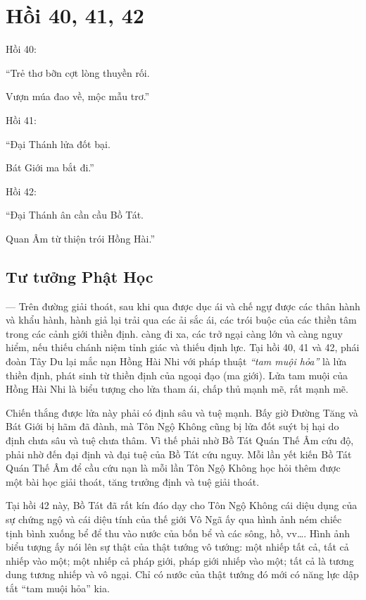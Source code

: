 \chapter{Hồi 40, 41, 42} %
\label{cha:hoi_40_41}

Hồi 40:

\begin{itshape}
``Trẻ thơ bỡn cợt lòng thuyền rối.

Vượn múa đao về, mộc mẫu trơ.''
\end{itshape}

Hồi 41:

\begin{itshape}
``Đại Thánh lửa đốt bại.

Bát Giới ma bắt đi.''
\end{itshape}

Hồi 42:

\begin{itshape}
``Đại Thánh ân cần cầu Bồ Tát.

Quan Âm từ thiện trói Hồng Hài.''
\end{itshape}

\section{Tư tưởng Phật Học} %
\label{sec:40_41_phat_hoc}

--- Trên đường giải thoát, sau khi qua được dục ái và chế ngự được các thân hành và khẩu hành, hành giả lại trải qua các ải sắc ái, các trói buộc của các thiền tâm trong các cảnh giới thiền định. càng đi xa, các trở ngại càng lớn và càng nguy hiểm, nếu thiếu chánh niệm tỉnh giác và thiếu định lực. Tại hồi 40, 41 và 42, phái đoàn Tây Du lại mắc nạn Hồng Hài Nhi với pháp thuật \emph{``tam muội hỏa''} là lửa thiền định, phát sinh từ thiền định của ngoại đạo (ma giới). Lửa tam muội của Hồng Hài Nhi là biểu tượng cho lửa tham ái, chấp thủ mạnh mẽ, rất mạnh mẽ.

Chiến thắng được lửa này phải có định sâu và tuệ mạnh. Bấy giờ Đường Tăng và Bát Giới bị hãm đã đành, mà Tôn Ngộ Không cũng bị lửa đốt suýt bị hại do định chưa sâu và tuệ chưa thâm. Vì thế phải nhờ Bồ Tát Quán Thế Âm cứu độ, phải nhờ đến đại định và đại tuệ của Bồ Tát cứu nguy. Mỗi lần yết kiến Bồ Tát Quán Thế Âm để cầu cứu nạn là mỗi lần Tôn Ngộ Không học hỏi thêm được một bài học giải thoát, tăng trưởng định và tuệ giải thoát.

Tại hồi 42 này, Bồ Tát đã rất kín đáo dạy cho Tôn Ngộ Không cái diệu dụng của sự chứng ngộ và cái diệu tính của thế giới Vô Ngã ấy qua hình ảnh ném chiếc tịnh bình xuống bể để thu vào nước của bốn bể và các sông, hồ, vv\ldots. Hình ảnh biểu tượng ấy nói lên sự thật của thật tướng vô tướng: một nhiếp tất cả, tất cả nhiếp vào một; một nhiếp cả pháp giới, pháp giới nhiếp vào một; tất cả là tương dung tương nhiếp và vô ngại. Chỉ có nước của thật tướng đó mới có năng lực dập tắt ``tam muội hỏa'' kia.


